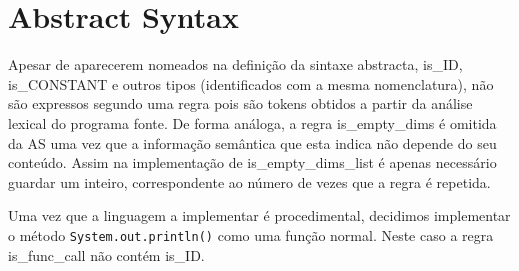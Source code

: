 \documentclass[a4paper]{article}
\title{\documentTitle}
\author{\documentAuthors{}}
\begin{document}
\renewcommand{\figurename}{Figure}
\maketitle
\cleardoublepage

\begin{comment}
\tableofcontents
\cleardoublepage


\section{Introduction}
\end{comment}
\setlength{\parindent}{1cm}
\setlength{\parskip}{0.3cm}
\section{Abstract Syntax}
\indent \indent Apesar de aparecerem nomeados na definição da sintaxe abstracta, is\_ID, \\
is\_CONSTANT e outros tipos (identificados com a mesma nomenclatura),
não são expressos segundo uma regra pois são tokens obtidos a partir da análise lexical do programa fonte.
De forma análoga, a regra is\_empty\_dims é omitida da AS uma vez que a informação semântica que esta indica não depende do seu conteúdo.
Assim na implementação de is\_empty\_dims\_list é apenas necessário guardar um inteiro, correspondente ao número de vezes que a regra é repetida.

Uma vez que a linguagem a implementar é procedimental, decidimos implementar o método \texttt{System.out.println()} como uma função normal.
Neste caso a regra is\_func\_call não contém is\_ID. 
\end{document}
